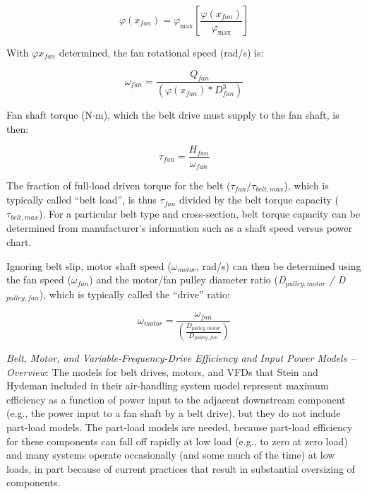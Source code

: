 \begin{equation}
\varphi \left( {{x_{fan}}} \right) = {\varphi_{\max }}\left[ {\frac{{\varphi \left( {{x_{fan}}} \right)}}{{{\varphi_{\max }}}}} \right]
\end{equation}

With \(\varphi {x_{fan}}\) determined, the fan rotational speed (rad/s) is:

\begin{equation}
{\omega_{fan}} = \frac{{{Q_{fan}}}}{{\left( {\varphi ({x_{fan}}) * D_{fan}^3} \right)}}
\end{equation}

Fan shaft torque (N\(\cdot\)m), which the belt drive must supply to the fan shaft, is then:

\begin{equation}
{\tau_{fan}} = \frac{{{H_{fan}}}}{{{\omega_{fan}}}}
\end{equation}

The fraction of full-load driven torque for the belt (\(\tau_{fan} / \tau_{belt,max}\)), which is typically called ``belt load'', is thus \emph{\(\tau_{fan}\)} divided by the belt torque capacity (\(\tau_{belt,max}\)). For a particular belt type and cross-section, belt torque capacity can be determined from manufacturer's information such as a shaft speed versus power chart.

Ignoring belt slip, motor shaft speed (\(\omega_{motor}\), rad/s) can then be determined using the fan speed (\(\omega_{fan}\)) and the motor/fan pulley diameter ratio (\emph{D\(_{pulley,motor}\) / D\(_{pulley,fan}\)}), which is typically called the ``drive'' ratio:

\begin{equation}
{\omega_{motor}} = \frac{{{\omega_{fan}}}}{{\left( {\frac{{{D_{pulley,motor}}}}{{{D_{pulley,fan}}}}} \right)}}
\end{equation}

\emph{Belt, Motor, and Variable-Frequency-Drive Efficiency and Input Power Models -- Overview}: The models for belt drives, motors, and VFDs that Stein and Hydeman included in their air-handling system model represent maximum efficiency as a function of power input to the adjacent downstream component (e.g., the power input to a fan shaft by a belt drive), but they do not include part-load models. The part-load models are needed, because part-load efficiency for these components can fall off rapidly at low load (e.g., to zero at zero load) and many systems operate occasionally (and some much of the time) at low loads, in part because of current practices that result in substantial oversizing of components.

